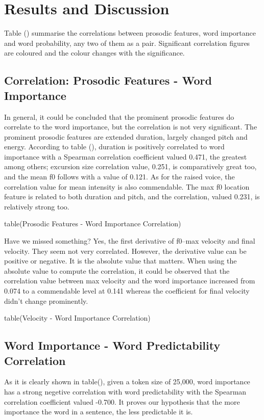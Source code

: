 \chapter{Results and Discussion}

Table () summarise the correlations between prosodic features, word importance and word probability, any two of them as a pair. Significant correlation figures are coloured and the colour changes with the significance. 

\section{Correlation: Prosodic Features - Word Importance }

In general, it could be concluded that the prominent prosodic features do correlate to the word importance, but the correlation is not very significant. The prominent prosodic features are extended duration, largely changed pitch and energy. According to table (), duration is positively correlated to word importance with a Spearman correlation coefficient valued 0.471, the greatest among others; excursion size correlation value, 0.251,  is comparatively great too, and the mean f0 follows with a value of 0.121. As for the raised voice, the correlation value for mean intensity is also commendable. The max f0 location feature is related to both duration and pitch, and the correlation, valued 0.231, is relatively strong too.

table(Prosodic Features - Word Importance Correlation)

Have we missed something? Yes, the first derivative of f0--max velocity and final velocity. They seem not very correlated. However, the derivative value can be positive or negative. It is the absolute value that matters. When using the absolute value to compute the correlation, it could be observed that the correlation value between max velocity and the word importance increased from 0.074 to a commendable level at 0.141 whereas the coefficient for final velocity didn't change prominently.

table(Velocity - Word Importance Correlation)

\section{Word Importance - Word Predictability Correlation}
As it is clearly shown in table(), given a token size of 25,000, word importance has a strong negetive correlation with word predictability with the Spearman correlation coefficient valued -0.700. It proves our hypothesis that the more importance the word in a sentence, the less predictable it is. 

